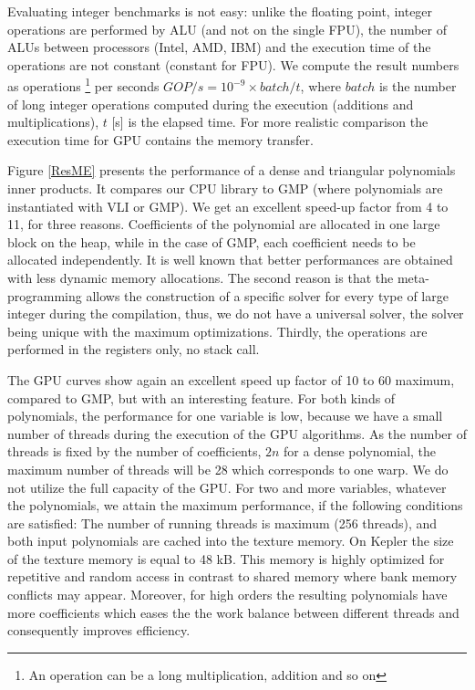 \documentclass[oribibl]{llncs2e/llncs}
\begin{document}
Evaluating  integer benchmarks  is not easy: unlike the floating point, integer operations are performed by ALU (and not on the single FPU),  the number of  ALUs  between processors (Intel, AMD, IBM) and the execution time of the operations are  not constant \cite{ASMcost} (constant for FPU).  We compute the  result  numbers as operations \footnote{An operation can be a long multiplication, addition and so on}   per seconds $GOP/s=10^{-9} \times batch/t$, where  $batch$ is the number of long integer operations computed during the execution (additions and multiplications), $t$ [s]  is the elapsed time. For more realistic comparison the execution time for GPU contains the memory  transfer. 

Figure \ref{ResME} presents the performance of a dense and triangular polynomials inner products. It compares our CPU library to GMP (where polynomials are  instantiated with VLI or GMP). We get an excellent speed-up factor from 4 to 11, for three reasons.
Coefficients of the  polynomial are allocated in one large block on the heap, while in the case of GMP, each coefficient needs to be allocated independently. It is well known that better performances are obtained with less dynamic memory allocations. The second reason is that  the meta-programming allows the construction of a specific solver for every type of large integer during the compilation, thus, we do not have a universal solver, the solver being unique with the maximum optimizations. Thirdly, the operations are performed in the registers only, no stack call.
  
The GPU curves show again an excellent speed up  factor of 10 to 60 maximum, compared to GMP, but with an interesting feature. 
For both kinds of polynomials, the performance for one variable is low, because we have a small number of threads during the execution of the GPU algorithms.
As the number of threads is fixed by the number of coefficients, $2n$ for a dense polynomial,  the maximum number of threads will be 28
 which corresponds to one warp. We do not utilize the full capacity of the GPU. For two and more variables, whatever the polynomials, 
  we attain the maximum performance,  if the following conditions are satisfied: The number of running threads is maximum (256 threads), and both input
  polynomials  are cached into the texture memory. On Kepler the size of the texture memory is equal to 48 kB. This memory  is highly optimized for repetitive and random access in contrast to shared memory
 where bank memory conflicts may appear.
Moreover, for high orders the resulting polynomials have more coefficients which eases the the work balance between different threads and consequently improves efficiency.
 
\end{document}
